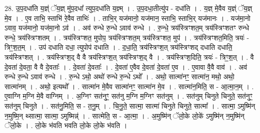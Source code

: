 \documentclass[17pt]{extarticle}
\begin{document}
28. उ॒प॒दधा॑ति य॒ज्ञ्ं ॅय॒ज्ञ् मु॑प॒दधा᳚ त्युप॒दधा॑ति य॒ज्ञ्म् । . उ॒प॒दधा॒तीत्यु॑प - दधा॑ति । . य॒ज्ञ् मे॒वैव य॒ज्ञ्ं ॅय॒ज्ञ् मे॒व । . ए॒व ताभि॒ स्ताभि॑ रे॒वैव ताभिः॑ । . ताभि॒र् यज॑मानो॒ यज॑मान॒ स्ताभि॒ स्ताभि॒र् यज॑मानः । . यज॑मा॒नो ऽवाव॒ यज॑मानो॒ यज॑मा॒नो ऽव॑ । . अव॑ रुन्धे रु॒न्धे ऽवाव॑ रुन्धे । . रु॒न्धे॒ त्रय॑स्त्रिꣳशत॒म् त्रय॑स्त्रिꣳशतꣳ रुन्धे रुन्धे॒ त्रय॑स्त्रिꣳशतम् । . त्रय॑स्त्रिꣳशत॒ मुपोप॒ त्रय॑स्त्रिꣳशत॒म् त्रय॑स्त्रिꣳशत॒ मुप॑ । . त्रय॑स्त्रिꣳशत॒मिति॒ त्रयः॑ - त्रिꣳ॒॒श॒त॒म् । . उप॑ दधाति दधा॒ त्युपोप॑ दधाति । . द॒धा॒ति॒ त्रय॑स्त्रिꣳश॒त् त्रय॑स्त्रिꣳशद् दधाति दधाति॒ त्रय॑स्त्रिꣳशत् । . त्रय॑स्त्रिꣳश॒द् वै वै त्रय॑स्त्रिꣳश॒त् त्रय॑स्त्रिꣳश॒द् वै । . त्रय॑स्त्रिꣳश॒दिति॒ त्रयः॑ - त्रिꣳ॒॒श॒त् । . वै दे॒वता॑ दे॒वता॒ वै वै दे॒वताः᳚ । . दे॒वता॑ दे॒वताः᳚ । . दे॒वता॑ ए॒वैव दे॒वता॑ दे॒वता॑ ए॒व । . ए॒वावा वै॒वै वाव॑ । . अव॑ रुन्धे रु॒न्धे ऽवाव॑ रुन्धे । . रु॒न्धे ऽथो॒ अथो॑ रुन्धे रु॒न्धे ऽथो᳚ । . अथो॒ सात्मा॑नꣳ॒॒ सात्मा॑न॒ मथो॒ अथो॒ सात्मा॑नम् । . अथो॒ इत्यथो᳚ । . सात्मा॑न मे॒वैव सात्मा॑नꣳ॒॒ सात्मा॑न मे॒व । . सात्मा॑न॒मिति॒ स - आ॒त्मा॒न॒म् । . ए॒वाग्नि म॒ग्नि मे॒वै वाग्निम् । . अ॒ग्निꣳ सत॑नुꣳ॒॒ सत॑नु म॒ग्नि म॒ग्निꣳ सत॑नुम् । . सत॑नुम् चिनुते चिनुते॒ सत॑नुꣳ॒॒ सत॑नुम् चिनुते । . सत॑नु॒मिति॒ स - त॒नु॒म् । . चि॒नु॒ते॒ सात्मा॒ सात्मा॑ चिनुते चिनुते॒ सात्मा᳚ । . सात्मा॒ ऽमुष्मि॑न् न॒मुष्मि॒न् थ्सात्मा॒ सात्मा॒ ऽमुष्मिन्न्॑ । . सात्मेति॒ स - आ॒त्मा॒ । . अ॒मुष्मि॑न् ॅलो॒के लो॒के॑ ऽमुष्मि॑न् न॒मुष्मि॑न् ॅलो॒के । . लो॒के भ॑वति भवति लो॒के लो॒के भ॑वति । \newline
\end{document}
